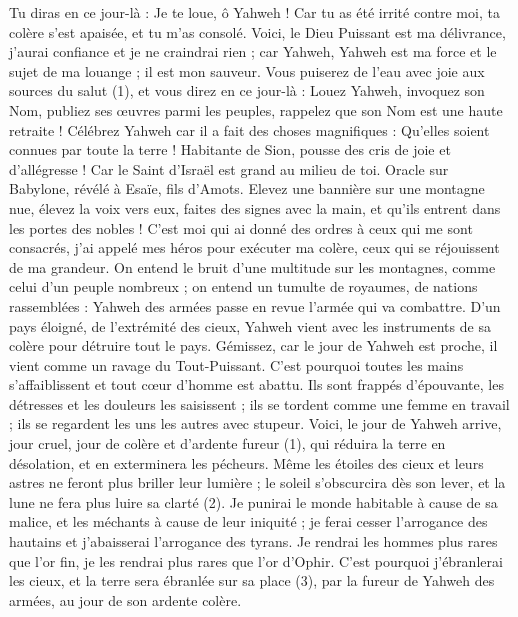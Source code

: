 \begin{multicols}{2}
{
\VerseOne{}Tu diras en ce jour-là : Je te loue, ô Yahweh ! Car tu as été irrité contre moi, ta colère s'est apaisée, et tu m'as consolé.
Voici, le Dieu Puissant est ma délivrance, j'aurai confiance et je ne craindrai rien ; car Yahweh, Yahweh est ma force et le sujet de ma louange ; il est mon sauveur.
Vous puiserez de l’eau avec joie aux sources du salut (1),
et vous direz en ce jour-là : Louez Yahweh, invoquez son Nom, publiez ses œuvres parmi les peuples, rappelez que son Nom est une haute retraite !
Célébrez Yahweh car il a fait des choses magnifiques : Qu'elles soient connues par toute la terre !
Habitante de Sion, pousse des cris de joie et d’allégresse ! Car le Saint d'Israël est grand au milieu de toi.
\VerseOne{}Oracle sur Babylone, révélé à Esaïe, fils d'Amots.
Elevez une bannière sur une montagne nue, élevez la voix vers eux, faites des signes avec la main, et qu’ils entrent dans les portes des nobles !
C'est moi qui ai donné des ordres à ceux qui me sont consacrés, j'ai appelé mes héros pour exécuter ma colère, ceux qui se réjouissent de ma grandeur.
On entend le bruit d’une multitude sur les montagnes, comme celui d’un peuple nombreux ; on entend un tumulte de royaumes, de nations rassemblées : Yahweh des armées passe en revue l'armée qui va combattre.
D’un pays éloigné, de l’extrémité des cieux, Yahweh vient avec les instruments de sa colère pour détruire tout le pays.
Gémissez, car le jour de Yahweh est proche, il vient comme un ravage du Tout-Puissant.
C'est pourquoi toutes les mains s’affaiblissent et tout cœur d'homme est abattu.
Ils sont frappés d’épouvante, les détresses et les douleurs les saisissent ; ils se tordent comme une femme en travail ; ils se regardent les uns les autres avec stupeur.
Voici, le jour de Yahweh arrive, jour cruel, jour de colère et d’ardente fureur (1), qui réduira la terre en désolation, et en exterminera les pécheurs.
Même les étoiles des cieux et leurs astres ne feront plus briller leur lumière ; le soleil s'obscurcira dès son lever, et la lune ne fera plus luire sa clarté (2).
Je punirai le monde habitable à cause de sa malice, et les méchants à cause de leur iniquité ; je ferai cesser l'arrogance des hautains et j'abaisserai l’arrogance des tyrans.
Je rendrai les hommes plus rares que l’or fin, je les rendrai plus rares que l’or d’Ophir.
C'est pourquoi j’ébranlerai les cieux, et la terre sera ébranlée sur sa place (3), par la fureur de Yahweh des armées, au jour de son ardente colère.
}
\end{multicols}
